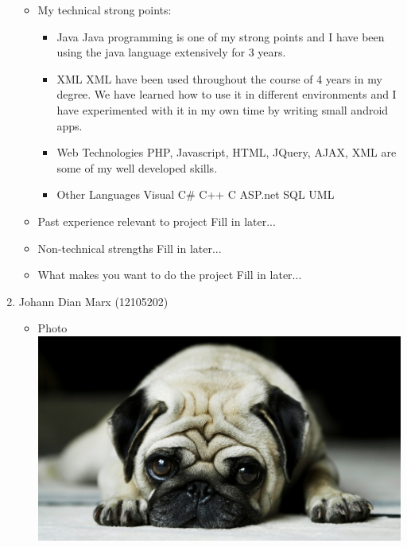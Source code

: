 \documentclass[12pt, oneside]{article}
\begin{document}
\begin{enumerate}
\begin{itemize}
			\item My technical strong points:
				\begin{itemize}
				\item Java\newline
					Java programming is one of my strong points and I have been using the java language extensively for 3 years.
				\item XML\newline
					XML have been used throughout the course of 4 years in my degree. We have learned how to use it 
					in different environments and I have experimented with it in my own time by writing small android apps.
				\item Web Technologies\newline
					PHP, Javascript, HTML, JQuery, AJAX, XML are some of my well developed skills.
				\item Other Languages\newline
					Visual C\#\newline
					C++\newline
					C\newline
					ASP.net\newline
					SQL\newline
					UML\newline	
				\end{itemize}
			\item Past experience relevant to project\newline
				Fill in later...
			\item Non-technical strengths\newline
				Fill in later...
			\item What makes you want to do the project\newline
				Fill in later...
		\end{itemize}
		\item {Johann Dian Marx (12105202)\par}
		\begin{itemize}
			\item Photo\newline
				\includegraphics[scale=0.1]{example} %

\end{itemize}
\end{enumerate}
\end{document}
